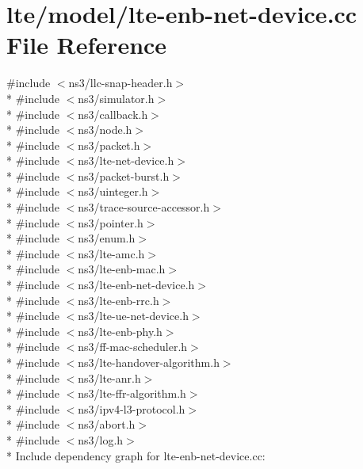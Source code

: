 \hypertarget{lte-enb-net-device_8cc}{}\section{lte/model/lte-\/enb-\/net-\/device.cc File Reference}
\label{lte-enb-net-device_8cc}
{\ttfamily \#include $<$ns3/llc-\/snap-\/header.\+h$>$}\\*
{\ttfamily \#include $<$ns3/simulator.\+h$>$}\\*
{\ttfamily \#include $<$ns3/callback.\+h$>$}\\*
{\ttfamily \#include $<$ns3/node.\+h$>$}\\*
{\ttfamily \#include $<$ns3/packet.\+h$>$}\\*
{\ttfamily \#include $<$ns3/lte-\/net-\/device.\+h$>$}\\*
{\ttfamily \#include $<$ns3/packet-\/burst.\+h$>$}\\*
{\ttfamily \#include $<$ns3/uinteger.\+h$>$}\\*
{\ttfamily \#include $<$ns3/trace-\/source-\/accessor.\+h$>$}\\*
{\ttfamily \#include $<$ns3/pointer.\+h$>$}\\*
{\ttfamily \#include $<$ns3/enum.\+h$>$}\\*
{\ttfamily \#include $<$ns3/lte-\/amc.\+h$>$}\\*
{\ttfamily \#include $<$ns3/lte-\/enb-\/mac.\+h$>$}\\*
{\ttfamily \#include $<$ns3/lte-\/enb-\/net-\/device.\+h$>$}\\*
{\ttfamily \#include $<$ns3/lte-\/enb-\/rrc.\+h$>$}\\*
{\ttfamily \#include $<$ns3/lte-\/ue-\/net-\/device.\+h$>$}\\*
{\ttfamily \#include $<$ns3/lte-\/enb-\/phy.\+h$>$}\\*
{\ttfamily \#include $<$ns3/ff-\/mac-\/scheduler.\+h$>$}\\*
{\ttfamily \#include $<$ns3/lte-\/handover-\/algorithm.\+h$>$}\\*
{\ttfamily \#include $<$ns3/lte-\/anr.\+h$>$}\\*
{\ttfamily \#include $<$ns3/lte-\/ffr-\/algorithm.\+h$>$}\\*
{\ttfamily \#include $<$ns3/ipv4-\/l3-\/protocol.\+h$>$}\\*
{\ttfamily \#include $<$ns3/abort.\+h$>$}\\*
{\ttfamily \#include $<$ns3/log.\+h$>$}\\*
Include dependency graph for lte-\/enb-\/net-\/device.cc\+:
